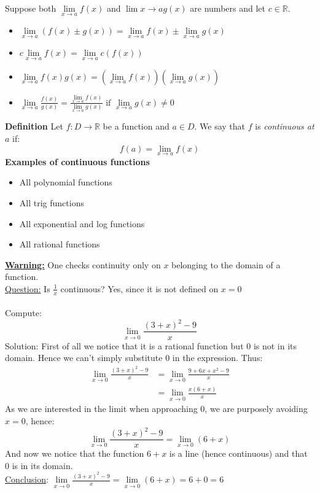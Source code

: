 \documentclass[]{article}
\begin{document}
	\noindent Suppose both $\lim\limits_{x\to a}f(x)$ and $\lim\limits{x\to a}g(x)$ are numbers and let $c\in\mathbb{R}$.
	\begin{itemize}
		\item $\lim\limits_{x\to a}(f(x)\pm g(x))=\lim\limits_{x\to a}f(x)\pm\lim\limits_{x\to a}g(x)$
		\item $c\lim\limits_{x\to a}f(x)=\lim\limits_{x\to a}c(f(x))$
		\item $\lim\limits_{x\to a}f(x)g(x)=\left( \lim\limits_{x\to a}f(x) \right)\left( \lim\limits_{x\to a}g(x) \right)$
		\item $\lim\limits_{x\to a}\frac{f(x)}{g(x)}=\frac{\lim\limits_{x\to a}f(x)}{\lim\limits_{x\to a}g(x)}\text{ if }\lim\limits_{x\to a}g(x)\ne 0$
	\end{itemize}
	{\bf Definition}
	Let $f:D\rightarrow\mathbb{R}$ be a function and $a\in D$. We say that $f$ is \emph{continuous at} $a$ if:
	$$
		f(a)=\lim_{x\to a}f(x)
	$$
	{\bf Examples of continuous functions}
	\begin{itemize}
		\item All polynomial functions
		\item All trig functions
		\item All exponential and log functions
		\item All rational functions
	\end{itemize}
	\underline{\bf Warning:} One checks continuity only on $x$ belonging to the domain of a function.\\
	\underline{Question:} Is $\frac{1}{x}$ continuous? Yes, since it is not defined on $x=0$\\\\
	Compute:
	$$
		\lim_{x\to 0}\frac{(3+x)^2-9}{x}
	$$
	Solution: First of all we notice that it is a rational function but 0 is not in its domain. Hence we can't simply substitute 0 in the expression. Thus:
	\begin{align*}
		\lim_{x\to 0}\frac{(3+x)^2-9}{x}&=\lim_{x\to 0}\frac{9+6x+x^2-9}{x}\\
		&=\lim_{x\to 0}\frac{x(6+x)}{x}
	\end{align*}
	As we are interested in the limit when approaching 0, we are purposely avoiding $x=0$, hence:
	$$
		\lim_{x\to 0}\frac{(3+x)^2-9}{x}=\lim_{x\to 0}(6+x)
	$$
	And now we notice that the function $6+x$ is a line (hence continuous) and that 0 is in its domain.\\
	\underline{Conclusion}: $\lim\limits_{x\to 0}\frac{(3+x)^2-9}{x}=\lim\limits_{x\to 0}(6+x)=6+0=6$\\
\end{document}
